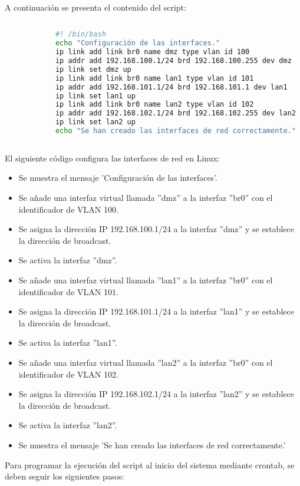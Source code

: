 		A continuación se presenta el contenido del script:
	
	
		\begin{lstlisting}[language=Bash, caption=script de configuración de red]
	
			#! /bin/bash
			echo "Configuración de las interfaces."
			ip link add link br0 name dmz type vlan id 100
			ip addr add 192.168.100.1/24 brd 192.168.100.255 dev dmz
			ip link set dmz up
			ip link add link br0 name lan1 type vlan id 101
			ip addr add 192.168.101.1/24 brd 192.168.101.1 dev lan1
			ip link set lan1 up
			ip link add link br0 name lan2 type vlan id 102
			ip addr add 192.168.102.1/24 brd 192.168.102.255 dev lan2
			ip link set lan2 up
			echo "Se han creado las interfaces de red correctamente."
	
		\end{lstlisting}
	
		El siguiente código configura las interfaces de red en Linux:
		
		\begin{itemize}
			\item Se muestra el mensaje 'Configuración de las interfaces'.
		    \item Se añade una interfaz virtual llamada ''dmz'' a la interfaz ''br0'' con el identificador de VLAN 100.
			\item Se asigna la dirección IP 192.168.100.1/24 a la interfaz ''dmz'' y se establece la dirección de broadcast.
			\item Se activa la interfaz ''dmz''.
			\item Se añade una interfaz virtual llamada ''lan1'' a la interfaz ''br0'' con el identificador de VLAN 101.
			\item Se asigna la dirección IP 192.168.101.1/24 a la interfaz ''lan1'' y se establece la dirección de broadcast.
			\item Se activa la interfaz ''lan1''.
			\item Se añade una interfaz virtual llamada ''lan2'' a la interfaz ''br0'' con el identificador de VLAN 102.
			\item Se asigna la dirección IP 192.168.102.1/24 a la interfaz ''lan2'' y se establece la dirección de broadcast.
			\item Se activa la interfaz ''lan2''.
			\item Se muestra el mensaje 'Se han creado las interfaces de red correctamente.'
		\end{itemize}
	
		Para programar la ejecución del script al inicio del sistema mediante crontab, se deben seguir los siguientes pasos:
	
